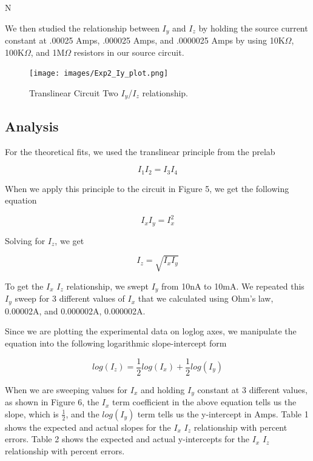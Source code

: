 N\documentclass{article}
\begin{document}
We then studied the relationship between $I_y$ and $I_z$ by holding the source current constant at .00025 Amps, .000025 Amps, and .0000025 Amps by using 10K$\Omega$, 100K$\Omega$, and 1M$\Omega$ resistors in our source  circuit. 
\begin{figure}[H]   
  \centering        
  \texttt{[image: images/Exp2\_Iy\_plot.png]}
  \caption{Translinear Circuit Two $I_y$/$I_z$ relationship.} 
  \label{fig:exp1_ixiz}
\end{figure}

\subsection{Analysis}
For the theoretical fits, we used the translinear principle from the prelab

\begin{centering}
$$I_1 I_2 = I_3 I_4$$
\end{centering}

When we apply this principle to the circuit in Figure 5, we get the following equation

\begin{centering}
$$I_x I_y = I_x ^2$$
\end{centering}

Solving for $I_z$, we get

\begin{centering}
$$I_z = \sqrt{I_x I_y}$$
\end{centering}

To get the $I_x$ $I_z$ relationship, we swept $I_y$ from 10nA to 10mA. We repeated this $I_y$ sweep for 3 different values of $I_x$ that we calculated using Ohm's law, 0.00002A, and 0.000002A, 0.000002A.

Since we are plotting the experimental data on loglog axes, we manipulate the equation into the following logarithmic slope-intercept form

\begin{centering}
$$log(I_z) = \frac{1}{2} log(I_x) + \frac{1}{2} log(I_y)$$
\end{centering}

When we are sweeping values for $I_x$ and holding $I_y$ constant at 3 different values, as shown in Figure 6, the $I_x$ term coefficient in the above equation tells us the slope, which is $\frac{1}{2}$, and the $log(I_y)$ term tells us the y-intercept in Amps. Table 1 shows the expected and actual slopes for the $I_x$ $I_z$ relationship with percent errors.
Table 2 shows the expected and actual y-intercepts for the $I_x$ $I_z$ relationship with percent errors.
\end{document}
